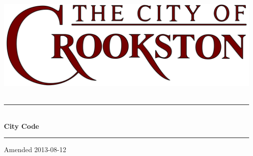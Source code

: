 \begin{titlepage}
\begin{center}

~\\[3cm]
\includegraphics[width=.75\textwidth]{./images/crookston_logo.png}~\\[2.5cm]

\hrule ~\\[0.4cm]
{\Huge\bfseries City Code}\\[0.4cm]
\hrule

\vfill

{\large Amended 2013-08-12}

\end{center}
\end{titlepage}
